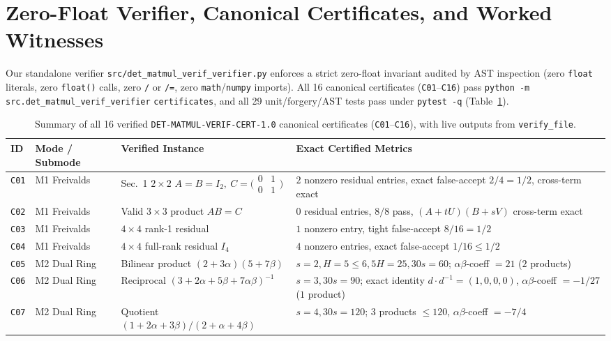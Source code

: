 \documentclass[10pt,twocolumn]{article}
\begin{document}
\section{Zero-Float Verifier, Canonical Certificates, and Worked Witnesses}
Our standalone verifier \nolinkurl{src/det_matmul_verif_verifier.py} enforces a strict zero-float invariant audited by AST inspection (zero \texttt{float} literals, zero \texttt{float()} calls, zero \texttt{/} or \texttt{/=}, zero \texttt{math}/\texttt{numpy} imports). All 16 canonical certificates (\texttt{C01}--\texttt{C16}) pass \texttt{python -m} \nolinkurl{src.det_matmul_verif_verifier} \texttt{certificates}, and all 29 unit/forgery/AST tests pass under \texttt{pytest -q} (Table~\ref{tab:certs}).

\begin{table}[t]
\centering
\scriptsize
\setlength{\tabcolsep}{3.8pt}
\caption{Summary of all 16 verified \texttt{DET-MATMUL-VERIF-CERT-1.0} canonical certificates (\texttt{C01}--\texttt{C16}), with live outputs from \texttt{verify\_file}.}
\label{tab:certs}
\begin{tabular}{@{}llll@{}}
\toprule
ID & Mode / Submode & Verified Instance & Exact Certified Metrics \\
\midrule
\texttt{C01} & M1 Freivalds & Sec.~1 $2\times 2$ $A=B=I_2,\ C=\bigl(\begin{smallmatrix}0&1\\0&1\end{smallmatrix}\bigr)$ & $2$ nonzero residual entries, exact false-accept $2/4 = 1/2$, cross-term exact \\
\texttt{C02} & M1 Freivalds & Valid $3\times 3$ product $AB=C$ & $0$ residual entries, $8/8$ pass, $(A+tU)(B+sV)$ cross-term exact \\
\texttt{C03} & M1 Freivalds & $4\times 4$ rank-1 residual & $1$ nonzero entry, tight false-accept $8/16 = 1/2$ \\
\texttt{C04} & M1 Freivalds & $4\times 4$ full-rank residual $I_4$ & $4$ nonzero entries, exact false-accept $1/16 \le 1/2$ \\
\texttt{C05} & M2 Dual Ring & Bilinear product $(2+3\alpha)(5+7\beta)$ & $s=2, H=5\le 6, 5H=25, 30s=60$; $\alpha\beta$-coeff $= 21$ ($2$ products) \\
\texttt{C06} & M2 Dual Ring & Reciprocal $(3+2\alpha+5\beta+7\alpha\beta)^{-1}$ & $s=3, 30s=90$; exact identity $d\cdot d^{-1}=(1,0,0,0)$, $\alpha\beta$-coeff $=-1/27$ ($1$ product) \\
\texttt{C07} & M2 Dual Ring & Quotient $(1+2\alpha+3\beta)/(2+\alpha+4\beta)$ & $s=4, 30s=120$; $3$ products $\le 120$, $\alpha\beta$-coeff $=-7/4$ \\

\end{tabular}
\end{table}
\end{document}

